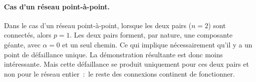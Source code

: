 \documentclass[french]{llncs}
\begin{document}
\paragraph{Cas d'un réseau point-à-point.} Dans le cas d'un réseau 
point-à-point, lorsque les deux pairs (\(n=2\)) sont connectés, alors \(p=1\). 
Les deux pairs forment, par nature, une composante géante, avec \(\alpha=0\) et 
un seul chemin. Ce qui implique nécessairement qu'il y a un point de 
défaillance unique. La démonstration résultante est donc moins intéressante. 
Mais cette défaillance se produit uniquement pour ces deux pairs et non pour le 
réseau entier~:~le reste des connexions continent de fonctionner.

\printbibliography
\end{document}
